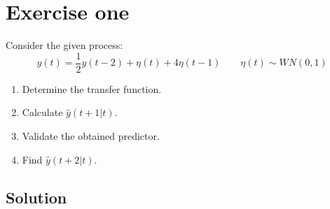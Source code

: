 \section{Exercise one}

Consider the given process:
\[y(t)=\dfrac{1}{2}y(t-2)+\eta(t)+4\eta(t-1)\qquad \eta(t)\sim WN(0,1)\]
\begin{enumerate}
    \item Determine the transfer function.
    \item Calculate $\hat{y}(t+1|t)$.
    \item Validate the obtained predictor.
    \item Find $\hat{y}(t+2|t)$.
\end{enumerate}

\subsection*{Solution}
